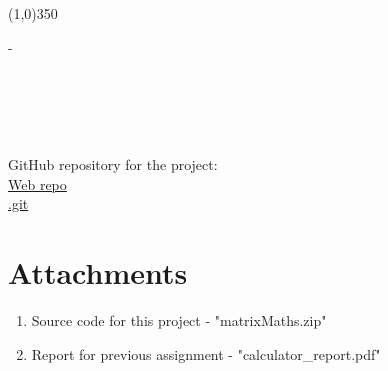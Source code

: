 \documentclass{article}
\begin{document}
	\begin{center}
		\line(1,0){350}
	\end{center}
	-
	\\ \\ \\ \\ \\ \\
	GitHub repository for the project: \\
	\href{https://github.com/catsymptote/matrixMaths}{Web repo} \\
	\href{https://github.com/catsymptote/matrixMaths.git}{.git}
	
	
	
	
	
	\clearpage
	
	
	\setcounter{secnumdepth}{0} %
	\hfill \break
	\section{Attachments}
	\begin{enumerate}
		\item Source code for this project - "matrixMaths.zip"
		\item Report for previous assignment - "calculator_report.pdf"
	\end{enumerate}
	
	
	
	
	
	\listoffigures
		
\end{document}
